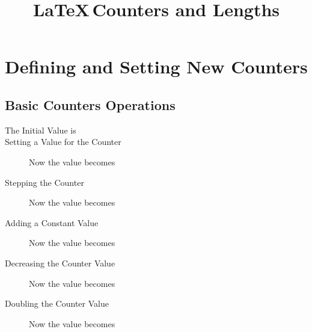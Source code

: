 \documentclass{article}
\title{\bf \LaTeX\,Counters and Lengths}
\date{}
\begin{document}
	\maketitle
	
	\section{Defining and Setting New Counters}
	
	\subsection{Basic Counters Operations}
	
	\begin{description}
		\item[The Initial Value is] \theNumber
		\item[Setting a Value for the Counter]
			\setcounter{Number}{15}
			Now the value becomes \theNumber
		\item[Stepping the Counter]
			Now the value becomes \theNumber
		\item[Adding a Constant Value]
			\addtocounter{Number}{4}
			Now the value becomes \theNumber
		\item[Decreasing the Counter Value]
			\addtocounter{Number}{-1}
			Now the value becomes \theNumber
		\item[Doubling the Counter Value]
			\addtocounter{Number}{\theNumber}
			Now the value becomes \theNumber
	\end{description}
	
\end{document}
